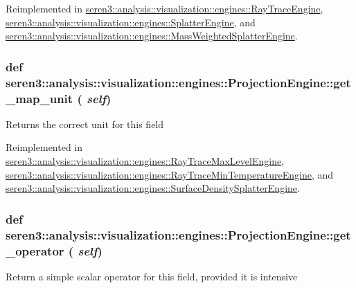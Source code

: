 Reimplemented in \hyperlink{classseren3_1_1analysis_1_1visualization_1_1engines_1_1RayTraceEngine_ab8058104b78f72e69896142942a4a964}{seren3::analysis::visualization::engines::RayTraceEngine}, \hyperlink{classseren3_1_1analysis_1_1visualization_1_1engines_1_1SplatterEngine_acb5713fdebb0354f14b8d3e1d00fc05b}{seren3::analysis::visualization::engines::SplatterEngine}, and \hyperlink{classseren3_1_1analysis_1_1visualization_1_1engines_1_1MassWeightedSplatterEngine_ac4d8bdd7049a6d50e5316fbb7777ad0a}{seren3::analysis::visualization::engines::MassWeightedSplatterEngine}.\hypertarget{classseren3_1_1analysis_1_1visualization_1_1engines_1_1ProjectionEngine_a2009db840c6f340e3c39d21dc81a3b77}{
\subsubsection[{get\_\-map\_\-unit}]{\setlength{\rightskip}{0pt plus 5cm}def seren3::analysis::visualization::engines::ProjectionEngine::get\_\-map\_\-unit ( {\em self})}}
\label{classseren3_1_1analysis_1_1visualization_1_1engines_1_1ProjectionEngine_a2009db840c6f340e3c39d21dc81a3b77}
\begin{DoxyVerb}
Returns the correct unit for this field
\end{DoxyVerb}
 

Reimplemented in \hyperlink{classseren3_1_1analysis_1_1visualization_1_1engines_1_1RayTraceMaxLevelEngine_ae614bc68c2ab9d2a68e8392175fc19e2}{seren3::analysis::visualization::engines::RayTraceMaxLevelEngine}, \hyperlink{classseren3_1_1analysis_1_1visualization_1_1engines_1_1RayTraceMinTemperatureEngine_ae0cd2459819fa5df91728a1a74e91f45}{seren3::analysis::visualization::engines::RayTraceMinTemperatureEngine}, and \hyperlink{classseren3_1_1analysis_1_1visualization_1_1engines_1_1SurfaceDensitySplatterEngine_ae2e4c1095a51c7cfeab0eebdcae10e37}{seren3::analysis::visualization::engines::SurfaceDensitySplatterEngine}.\hypertarget{classseren3_1_1analysis_1_1visualization_1_1engines_1_1ProjectionEngine_a42f12a0ccc166799a59549d9fe672f2b}{
\subsubsection[{get\_\-operator}]{\setlength{\rightskip}{0pt plus 5cm}def seren3::analysis::visualization::engines::ProjectionEngine::get\_\-operator ( {\em self})}}
\label{classseren3_1_1analysis_1_1visualization_1_1engines_1_1ProjectionEngine_a42f12a0ccc166799a59549d9fe672f2b}
\begin{DoxyVerb}
Return a simple scalar operator for this field, provided it is intensive
\end{DoxyVerb}
 

